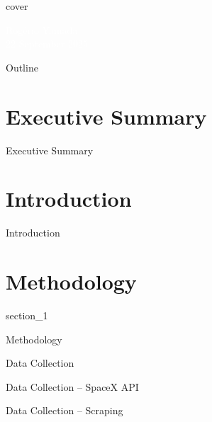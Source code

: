 {
{cover}
\begin{frame}
    \vspace{5cm}
    \textcolor{white}{Rogério Yamada \\ 22 September 2025}
\end{frame}
}

\begin{frame}{Outline}
    \tableofcontents
\end{frame}

\section{Executive Summary}

\begin{frame}{Executive Summary}

\end{frame}

\section{Introduction}

\begin{frame}{Introduction}

\end{frame}

\section{Methodology}

{
{section_1}
\begin{frame}[plain]
\end{frame}
}

\begin{frame}{Methodology}

\end{frame}

\begin{frame}{Data Collection}

\end{frame}

\begin{frame}{Data Collection -- SpaceX API}

\end{frame}

\begin{frame}{Data Collection -- Scraping}

\end{frame}

